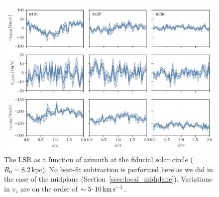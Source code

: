 \documentclass[twocolumn]{aastex62}
\newcommand{\kpc}{\text{kpc}}
\newcommand{\kms}{\text{km}\,\text{s}^{-1}}
\begin{document}
\begin{figure}[htb!]
\begin{center}
\includegraphics[width=\textwidth]{fig/lsr.pdf}
\end{center}
\caption{The LSR as a function of azimuth at the
fiducial solar circle ($R_0 = 8.2\,\kpc$). No best-fit subtraction is
performed here as we did in the case of the midplane
(Section~\ref{ssec:local_midplane}). Variations in $v_z$ are on the order of
$\sim5\textup{--}10\,\kms$.}
\label{fig:lsr_variations}
\end{figure}


\end{document}
